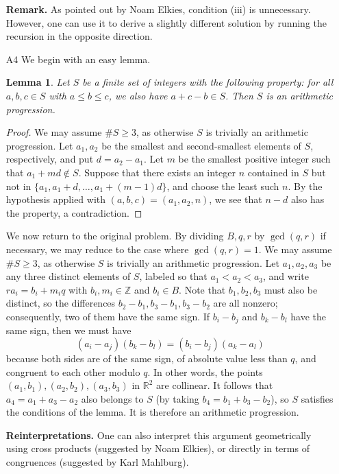 \documentclass[amssymb,twocolumn,pra,10pt,aps]{revtex4-1}
\newtheorem*{lemma*}{Lemma}
\newcommand{\RR}{\mathbb{R}}
\newcommand{\ZZ}{\mathbb{Z}}
\begin{document}
\begin{itemize}
\noindent
\textbf{Remark.} As pointed out by Noam Elkies, condition (iii) is unnecessary.
However, one can use it to derive a slightly different solution by running the recursion
in the opposite direction.

\item[A4]
We begin with an easy lemma.
\setcounter{lemma}{0}
\begin{lemma*}
Let $S$ be a finite set of integers with the following property: for all $a,b,c \in S$ with
$a \leq b \leq c$, we also have $a+c-b \in S$. Then $S$ is an arithmetic progression.
\end{lemma*}
\begin{proof}
We may assume $\# S \geq 3$, as otherwise $S$ is trivially an arithmetic progression.
Let $a_1, a_2$ be the smallest and second-smallest elements of $S$, respectively, and put
$d = a_2 - a_1$. Let $m$ be the smallest positive integer such that $a_1 + md \notin S$.
Suppose that there exists an integer $n$ contained in $S$ but not in
$\{a_1, a_1 + d, \dots, a_1 + (m-1)d\}$, and choose the least such $n$.
By the hypothesis applied with $(a,b,c) = (a_1, a_2, n)$, we see that $n-d$ also has the property,
a contradiction.
\end{proof}

We now return to the original problem.
By dividing $B, q, r$ by $\gcd(q,r)$ if necessary, we may reduce to the case where $\gcd(q,r) = 1$.
We may assume $\#S \geq 3$, as otherwise $S$ is trivially an arithmetic progression.
Let $a_1, a_2, a_3$ be any three distinct elements of $S$, labeled so that $a_1 < a_2 < a_3$,
and write $ra_i = b_i + m_i q$ with $b_i, m_i \in \ZZ$ and $b_i \in B$. Note that $b_1, b_2, b_3$ must also be distinct, so the differences $b_2 - b_1, b_3 - b_1, b_3 - b_2$ are all nonzero; consequently, two of them have the same sign. If $b_i - b_j$ and $b_k - b_l$ have the same sign, then
we must have
\[
(a_i - a_j)(b_k - b_l) =  (b_i - b_j)(a_k - a_l)
\]
because both sides are of the same sign, of absolute value less than $q$,
and congruent to each other modulo $q$. In other words, the points $(a_1, b_1), (a_2, b_2), (a_3, b_3)$
in $\RR^2$ are collinear.
It follows that $a_4 = a_1 + a_3 - a_2$ also belongs to $S$ (by taking $b_4 = b_1 + b_3 - b_2$),
so $S$ satisfies the conditions of the lemma. It is therefore an
arithmetic progression.

\noindent
\textbf{Reinterpretations.}
One can also interpret this argument geometrically using cross products (suggested by Noam Elkies),
or directly in terms of congruences (suggested by Karl Mahlburg).


\end{itemize}
\end{document}
